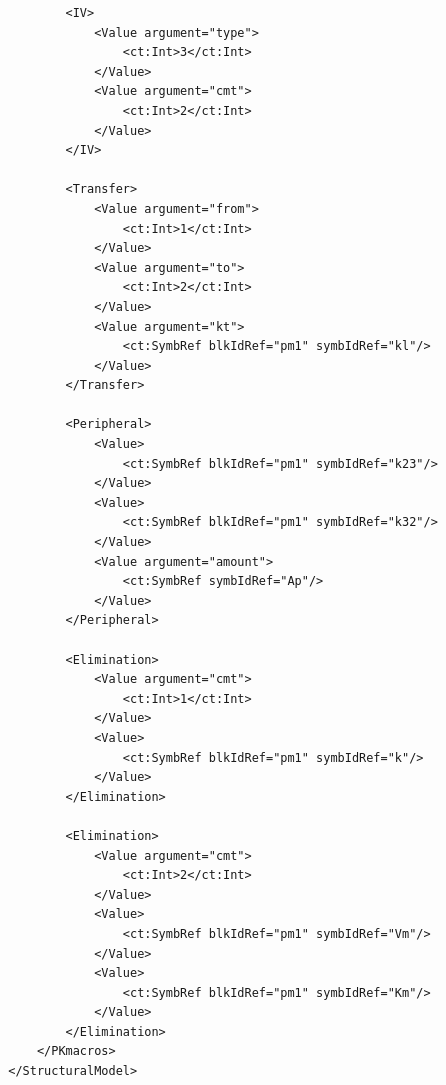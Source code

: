 \begin{lstlisting}
                <IV>
                    <Value argument="type">
                        <ct:Int>3</ct:Int>
                    </Value>
                    <Value argument="cmt">
                        <ct:Int>2</ct:Int>
                    </Value>
                </IV>
                
                <Transfer>
                    <Value argument="from">
                        <ct:Int>1</ct:Int>
                    </Value>
                    <Value argument="to">
                        <ct:Int>2</ct:Int>
                    </Value>
                    <Value argument="kt">
                        <ct:SymbRef blkIdRef="pm1" symbIdRef="kl"/>
                    </Value>
                </Transfer>
                
                <Peripheral>
                    <Value>
                        <ct:SymbRef blkIdRef="pm1" symbIdRef="k23"/>
                    </Value>
                    <Value>
                        <ct:SymbRef blkIdRef="pm1" symbIdRef="k32"/>
                    </Value>
                    <Value argument="amount">
                        <ct:SymbRef symbIdRef="Ap"/>
                    </Value>
                </Peripheral>
                
                <Elimination>
                    <Value argument="cmt">
                        <ct:Int>1</ct:Int>
                    </Value>
                    <Value>
                        <ct:SymbRef blkIdRef="pm1" symbIdRef="k"/>
                    </Value>
                </Elimination>
                
                <Elimination>
                    <Value argument="cmt">
                        <ct:Int>2</ct:Int>
                    </Value>
                    <Value>
                        <ct:SymbRef blkIdRef="pm1" symbIdRef="Vm"/>
                    </Value>
                    <Value>
                        <ct:SymbRef blkIdRef="pm1" symbIdRef="Km"/>
                    </Value>
                </Elimination>
            </PKmacros>
        </StructuralModel>
\end{lstlisting}



